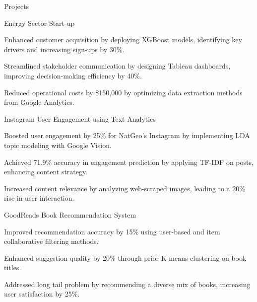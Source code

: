 \documentclass{resume} %
\begin{document}
    \begin{rSection}{Projects}
                    \begin{rSubsection}
                                    {Energy Sector Start{-}up}
                                {}{}{}
                                    \item Enhanced customer acquisition by deploying XGBoost models, identifying key drivers and increasing sign{-}ups by 30\%.
                                    \item Streamlined stakeholder communication by designing Tableau dashboards, improving decision{-}making efficiency by 40\%.
                                    \item Reduced operational costs by \$150,000 by optimizing data extraction methods from Google Analytics.
                            \end{rSubsection}
                    \begin{rSubsection}
                                    {Instagram User Engagement using Text Analytics}
                                {}{}{}
                                    \item Boosted user engagement by 25\% for NatGeo's Instagram by implementing LDA topic modeling with Google Vision.
                                    \item Achieved 71.9\% accuracy in engagement prediction by applying TF{-}IDF on posts, enhancing content strategy.
                                    \item Increased content relevance by analyzing web{-}scraped images, leading to a 20\% rise in user interaction.
                            \end{rSubsection}
                    \begin{rSubsection}
                                    {GoodReads Book Recommendation System}
                                {}{}{}
                                    \item Improved recommendation accuracy by 15\% using user{-}based and item collaborative filtering methods.
                                    \item Enhanced suggestion quality by 20\% through prior K{-}means clustering on book titles.
                                    \item Addressed long tail problem by recommending a diverse mix of books, increasing user satisfaction by 25\%.
                            \end{rSubsection}
            \end{rSection}
\end{document}
